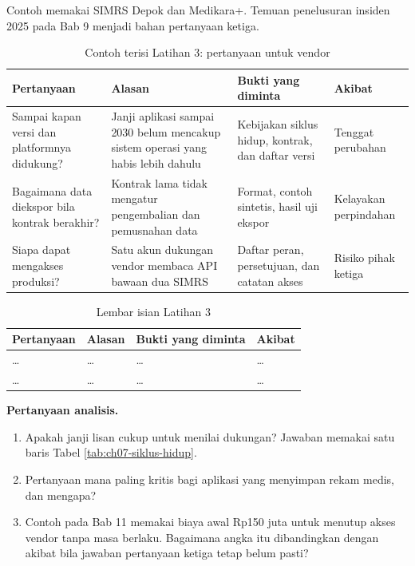 Contoh memakai SIMRS Depok dan Medikara+. Temuan penelusuran insiden 2025 pada Bab 9 menjadi bahan pertanyaan ketiga.

\begin{table}[!htb]
  \centering
  \caption{Contoh terisi Latihan 3: pertanyaan untuk vendor}
  \label{tab:ch07-lat3-contoh}
  \small
  \begin{tabularx}{\textwidth}{>{\raggedright\arraybackslash}p{2.7cm}>{\raggedright\arraybackslash}X>{\raggedright\arraybackslash}X>{\raggedright\arraybackslash}p{2.5cm}}
    \hline
    \textbf{Pertanyaan} & \textbf{Alasan} & \textbf{Bukti yang diminta} & \textbf{Akibat} \\
    \hline
    Sampai kapan versi dan platformnya didukung? & Janji aplikasi sampai 2030 belum mencakup sistem operasi yang habis lebih dahulu & Kebijakan siklus hidup, kontrak, dan daftar versi & Tenggat perubahan \\
    \hline
    Bagaimana data diekspor bila kontrak berakhir? & Kontrak lama tidak mengatur pengembalian dan pemusnahan data & Format, contoh sintetis, hasil uji ekspor & Kelayakan perpindahan \\
    \hline
    Siapa dapat mengakses produksi? & Satu akun dukungan vendor membaca API bawaan dua SIMRS & Daftar peran, persetujuan, dan catatan akses & Risiko pihak ketiga \\
    \hline
  \end{tabularx}
\end{table}

\begin{table}[!htb]
  \centering
  \caption{Lembar isian Latihan 3}
  \label{tab:ch07-lat3-hasil}
  \small
  \begin{tabularx}{\textwidth}{>{\raggedright\arraybackslash}p{2.7cm}>{\raggedright\arraybackslash}X>{\raggedright\arraybackslash}X>{\raggedright\arraybackslash}p{2.5cm}}
    \hline
    \textbf{Pertanyaan} & \textbf{Alasan} & \textbf{Bukti yang diminta} & \textbf{Akibat} \\
    \hline
    \dots & \dots & \dots & \dots \\
    \hline
    \dots & \dots & \dots & \dots \\
    \hline
  \end{tabularx}
\end{table}

\textbf{Pertanyaan analisis.}

\begin{enumerate}
  \item Apakah janji lisan cukup untuk menilai dukungan? Jawaban memakai satu baris Tabel \ref{tab:ch07-siklus-hidup}.
  \item Pertanyaan mana paling kritis bagi aplikasi yang menyimpan rekam medis, dan mengapa?
  \item Contoh pada Bab 11 memakai biaya awal Rp150 juta untuk menutup akses vendor tanpa masa berlaku. Bagaimana angka itu dibandingkan dengan akibat bila jawaban pertanyaan ketiga tetap belum pasti?
\end{enumerate}
